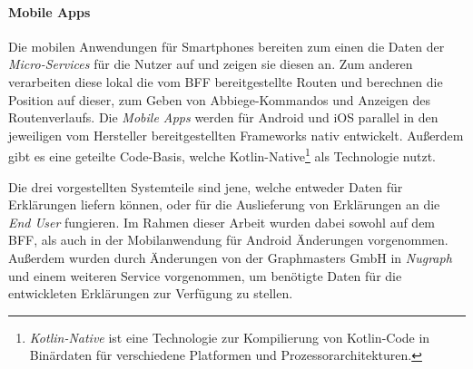 \paragraph{Mobile Apps} Die mobilen Anwendungen für Smartphones bereiten zum einen die Daten der \textit{Micro-Services} für die Nutzer auf und zeigen sie diesen an. Zum anderen verarbeiten diese lokal die vom BFF bereitgestellte Routen und berechnen die Position auf dieser, zum Geben von Abbiege-Kommandos und Anzeigen des Routenverlaufs. Die \textit{Mobile Apps} werden für Android und iOS parallel in den jeweiligen vom Hersteller bereitgestellten Frameworks nativ entwickelt. Außerdem gibt es eine geteilte Code-Basis, welche Kotlin-Native\footnote{\textit{Kotlin-Native} ist eine Technologie zur Kompilierung von Kotlin-Code in Binärdaten für verschiedene Platformen und Prozessorarchitekturen.} als Technologie nutzt.

\bigskip

Die drei vorgestellten Systemteile sind jene, welche entweder Daten für Erklärungen liefern können, oder für die Auslieferung von Erklärungen an die \textit{End User} fungieren. Im Rahmen dieser Arbeit wurden dabei sowohl auf dem BFF, als auch in der Mobilanwendung für Android Änderungen vorgenommen. Außerdem wurden durch Änderungen von der Graphmasters GmbH in \textit{Nugraph} und einem weiteren Service vorgenommen, um benötigte Daten für die entwickleten Erklärungen zur Verfügung zu stellen.
